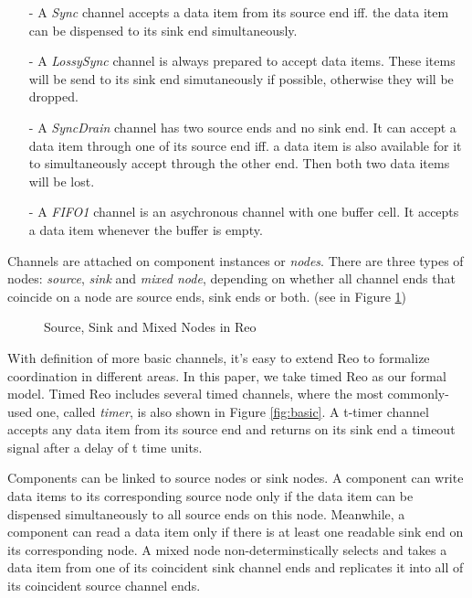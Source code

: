 \documentclass[conference, a4paper]{IEEEtran}
\begin{document}
\begin{itemize}
  \item [-] A \emph{Sync} channel accepts a data item from its source end iff. the data item can be
    dispensed to its sink end simultaneously.
  \item [-] A \emph{LossySync} channel is always prepared to accept data items. These items will be
    send to its sink end simutaneously if possible, otherwise they will be dropped.
  \item [-] A \emph{SyncDrain} channel has two source ends and no sink end. It can accept a data
    item through one of its source end iff. a data item is also available for it to simultaneously
    accept through the other end. Then both two data items will be lost.
  \item [-] A \emph{FIFO1} channel is an asychronous channel with one buffer cell. It accepts a
    data item whenever the buffer is empty.  
\end{itemize}

Channels are attached on component instances or \emph{nodes}. There are three types of nodes:
\emph{source}, \emph{sink} and \emph{mixed node}, depending on whether all channel ends that
coincide on a node are source ends, sink ends or both. (see in Figure \ref{fig:node})

\begin{figure}[h]
  \begin{center}
    
  \end{center}
  \caption{Source, Sink and Mixed Nodes in Reo}
  \label{fig:node}
\end{figure}



With definition of more basic channels, it's easy to extend Reo to formalize coordination in
different areas. In this paper, we take timed Reo\cite{DBLP:conf/sefm/ArbabBBR04} as our formal
model. Timed Reo includes several timed channels, where the most commonly-used one, called
\emph{timer}, is also shown in Figure \ref{fig:basic}. A t-timer channel accepts any data item from
its source end and returns on its sink end a timeout signal after a delay of t time units.

Components can be linked to source nodes or sink nodes. A component can write data items to its
corresponding source node only if the data item can be dispensed simultaneously to all source ends
on this node. Meanwhile, a component can read a data item only if there is at least one readable
sink end on its corresponding node. A mixed node non-determinstically selects and takes a data item
from one of its coincident sink channel ends and replicates it into all of its coincident source
channel ends.
\end{document}
